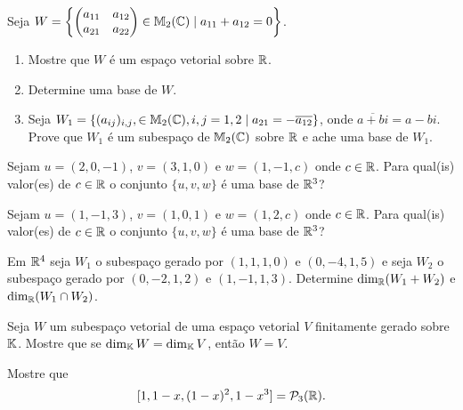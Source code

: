 \documentclass[12pt]{exam}
\begin{document}
    \begin{exercicio}
        Seja $W = \left\{\begin{pmatrix} a_{11} & a_{12}\\ a_{21} & a_{22}\end{pmatrix} \in \mathbb{M}_2(\mathbb{C}) \mid a_{11} + a_{12} = 0\right\}$.
        \begin{enumerate}[label={\alph*})]
            \item Mostre que $W$ é um espaço vetorial sobre $\mathbb{R}$.

            \item Determine uma base de $W$.

            \item Seja $W_1 = \{(a_{ij})_{i,j}, \in \mathbb{M}_2(\mathbb{C}), i, j = 1, 2 \mid a_{21} = -\overline{a_{12}}\}$, onde $\overline{a + bi} = a - bi$. Prove que $W_1$ é um subespaço de $\mathbb{M}_2(\mathbb{C})$ sobre $\mathbb{R}$ e ache uma base de $W_1$.
        \end{enumerate}
    \end{exercicio}

    \begin{exercicio}
        Sejam $u = (2, 0 , -1)$, $v = (3, 1 , 0)$ e $w = (1, -1 , c)$ onde $c \in \mathbb{R}$. Para qual(is) valor(es) de $c \in \mathbb{R}$ o conjunto $\{u, v, w\}$ é uma base de $\mathbb{R}^3$?
    \end{exercicio}

    \begin{exercicio}
        Sejam $u = (1, -1 , 3)$, $v = (1, 0 , 1)$ e $w = (1, 2 , c)$ onde $c \in \mathbb{R}$. Para qual(is) valor(es) de $c \in \mathbb{R}$ o conjunto $\{u, v, w\}$ é uma base de $\mathbb{R}^3$?
    \end{exercicio}

    \begin{exercicio}
        Em $\mathbb{R}^4$ seja $W_1$ o subespaço gerado por $(1,1,1,0)$ e $(0,-4,1,5)$ e seja $W_2$ o subespaço gerado por $(0,-2,1,2)$ e $(1,-1,1,3)$. Determine $\dim_{\mathbb{R}}(W_1 + W_2)$ e $\dim_{\mathbb{R}}(W_1 \cap W_2)$.
    \end{exercicio}

    \begin{exercicio}
        Seja $W$ um subespaço vetorial de uma espaço vetorial $V$ finitamente gerado sobre $\mathbb{K}$. Mostre que se $\dim_{\mathbb{K}}W = \dim_{\mathbb{K}}V$, então $W = V$.
    \end{exercicio}

    \begin{exercicio}
        Mostre que
        \[
            [1, 1 - x, (1 - x)^2, 1 - x^3] = \mathcal{P}_3(\mathbb{R}).
        \]
    \end{exercicio}
\end{document}

